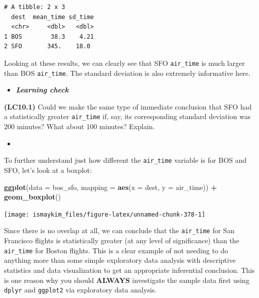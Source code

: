 \documentclass[12pt,]{krantz}
\makeatletter
\newenvironment{Shaded}{\begin{snugshade}}{\end{snugshade}}
\newcommand{\KeywordTok}[1]{\textcolor[rgb]{0.27,0.27,0.27}{\textbf{#1}}}
\newcommand{\DataTypeTok}[1]{\textcolor[rgb]{0.27,0.27,0.27}{#1}}
\newcommand{\StringTok}[1]{\textcolor[rgb]{0.5,0.5,0.5}{#1}}
\newcommand{\OperatorTok}[1]{\textcolor[rgb]{0.43,0.43,0.43}{\textbf{#1}}}
\newcommand{\NormalTok}[1]{#1}
\newenvironment{kframe}{%
\medskip{}
\setlength{\fboxsep}{.8em}
 \def\at@end@of@kframe{}%
 \ifinner\ifhmode%
  \def\at@end@of@kframe{\end{minipage}}%
  \begin{minipage}{\columnwidth}%
 \fi\fi%
 \def\FrameCommand##1{\hskip\@totalleftmargin \hskip-\fboxsep
 \colorbox{shadecolor}{##1}\hskip-\fboxsep
     \hskip-\linewidth \hskip-\@totalleftmargin \hskip\columnwidth}%
 \MakeFramed {\advance\hsize-\width
   \@totalleftmargin\z@ \linewidth\hsize
   \@setminipage}}%
 {\par\unskip\endMakeFramed%
 \at@end@of@kframe}
\renewenvironment{Shaded}{\begin{kframe}}{\end{kframe}}
\newenvironment{rmdblock}[1]
  {\begin{shaded*}
  \begin{itemize}
  \renewcommand{\labelitemi}{
    \raisebox{-.7\height}[0pt][0pt]{
    }
  }
  \item
  }
  {
  \end{itemize}
  \end{shaded*}
  }
\newenvironment{learncheck}
  {\begin{rmdblock}{warning}}
  {\end{rmdblock}}
\theoremstyle{definition}
\theoremstyle{definition}
\theoremstyle{definition}
\theoremstyle{remark}
\makeatother
\begin{document}
\begin{verbatim}
# A tibble: 2 x 3
  dest  mean_time sd_time
  <chr>     <dbl>   <dbl>
1 BOS        38.3    4.21
2 SFO       345.    18.0 
\end{verbatim}

Looking at these results, we can clearly see that SFO \texttt{air\_time}
is much larger than BOS \texttt{air\_time}. The standard deviation is
also extremely informative here.

\begin{learncheck}
\textbf{\emph{Learning check}}
\end{learncheck}

\textbf{(LC10.1)} Could we make the same type of immediate conclusion
that SFO had a statistically greater \texttt{air\_time} if, say, its
corresponding standard deviation was 200 minutes? What about 100
minutes? Explain.

\begin{learncheck}

\end{learncheck}

To further understand just how different the \texttt{air\_time} variable
is for BOS and SFO, let's look at a boxplot:

\begin{Shaded}
\begin{Highlighting}[]
\KeywordTok{ggplot}\NormalTok{(}\DataTypeTok{data =}\NormalTok{ bos_sfo, }\DataTypeTok{mapping =} \KeywordTok{aes}\NormalTok{(}\DataTypeTok{x =}\NormalTok{ dest, }\DataTypeTok{y =}\NormalTok{ air_time)) }\OperatorTok{+}
\StringTok{  }\KeywordTok{geom_boxplot}\NormalTok{()}
\end{Highlighting}
\end{Shaded}

\begin{center}\texttt{[image: ismaykim\_files/figure-latex/unnamed-chunk-378-1]} \end{center}

Since there is no overlap at all, we can conclude that the
\texttt{air\_time} for San Francisco flights is statistically greater
(at any level of significance) than the \texttt{air\_time} for Boston
flights. This is a clear example of not needing to do anything more than
some simple exploratory data analysis with descriptive statistics and
data visualization to get an appropriate inferential conclusion. This is
one reason why you should \textbf{ALWAYS} investigate the sample data
first using \texttt{dplyr} and \texttt{ggplot2} via exploratory data
analysis.
\end{document}
